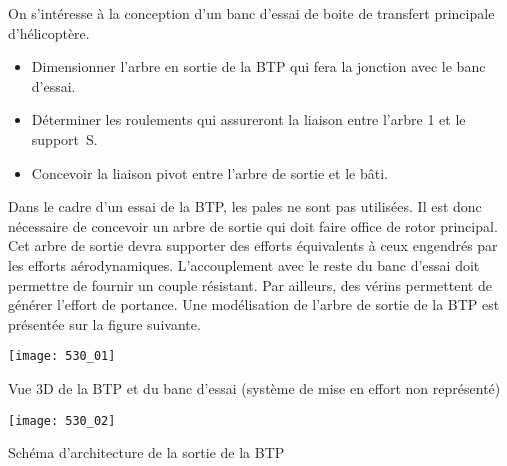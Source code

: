 \normaltrue
\correctionfalse


\setcounter{question}{0}%

\ifcorrection
\else
{}
\fi


On s'intéresse à la conception d'un banc d'essai de boite de transfert principale d'hélicoptère. 



\begin{obj}
\begin{itemize}
\item Dimensionner l’arbre en sortie de la BTP qui fera la jonction avec le banc d’essai.
\item Déterminer les roulements qui assureront la liaison entre l’arbre 1 et le support~S.
\item Concevoir la liaison pivot entre l’arbre de sortie et le bâti.
\end{itemize}
\end{obj}

\ifprof
\else

Dans le cadre d’un essai de la BTP, les pales ne sont pas utilisées. Il est donc nécessaire de concevoir un arbre de sortie qui doit faire office de rotor principal. Cet arbre de sortie devra supporter des efforts équivalents à ceux engendrés par les efforts aérodynamiques. L’accouplement avec le reste du banc d’essai doit permettre de fournir un couple résistant. Par ailleurs, des vérins permettent de générer l’effort de portance. Une modélisation de l’arbre de sortie de la BTP est présentée sur la figure suivante.

 
\begin{marginfigure}
\texttt{[image: 530\_01]}

\caption{Vue 3D de la BTP et du banc d’essai (système de mise en effort non représenté)}
\end{marginfigure}


\begin{marginfigure}
\texttt{[image: 530\_02]}

\caption{Schéma d’architecture de la sortie de la BTP}
\end{marginfigure}



